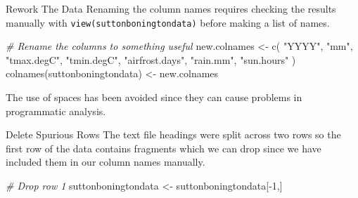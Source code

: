 \documentclass[
  ignorenonframetext,
]{beamer}
\newenvironment{Shaded}{\begin{snugshade}}{\end{snugshade}}
\newcommand{\CommentTok}[1]{\textcolor[rgb]{0.56,0.35,0.01}{\textit{#1}}}
\newcommand{\DecValTok}[1]{\textcolor[rgb]{0.00,0.00,0.81}{#1}}
\newcommand{\FunctionTok}[1]{\textcolor[rgb]{0.00,0.00,0.00}{#1}}
\newcommand{\NormalTok}[1]{#1}
\newcommand{\OtherTok}[1]{\textcolor[rgb]{0.56,0.35,0.01}{#1}}
\newcommand{\SpecialCharTok}[1]{\textcolor[rgb]{0.00,0.00,0.00}{#1}}
\newcommand{\StringTok}[1]{\textcolor[rgb]{0.31,0.60,0.02}{#1}}
\begin{document}
\begin{frame}[fragile]{Rework The Data}
\protect\hypertarget{rework-the-data}{}
Renaming the column names requires checking the results manually with
\texttt{view(suttonboningtondata)} before making a list of names.

\begin{Shaded}
\begin{Highlighting}[]
\CommentTok{\# Rename the columns to something useful}
\NormalTok{new.colnames }\OtherTok{\textless{}{-}} \FunctionTok{c}\NormalTok{( }\StringTok{"YYYY"}\NormalTok{,}
                   \StringTok{"mm"}\NormalTok{,}
                   \StringTok{"tmax.degC"}\NormalTok{,}
                   \StringTok{"tmin.degC"}\NormalTok{,}
                   \StringTok{"airfrost.days"}\NormalTok{,}
                   \StringTok{"rain.mm"}\NormalTok{,}
                   \StringTok{"sun.hours"}
\NormalTok{  )}
\FunctionTok{colnames}\NormalTok{(suttonboningtondata) }\OtherTok{\textless{}{-}}\NormalTok{ new.colnames}
\end{Highlighting}
\end{Shaded}

The use of spaces has been avoided since they can cause problems in
programmatic analysis.
\end{frame}

\begin{frame}[fragile]{Delete Spurious Rows}
\protect\hypertarget{delete-spurious-rows}{}
The text file headings were split across two rows so the first row of
the data contains fragments which we can drop since we have included
them in our column names manually.

\begin{Shaded}
\begin{Highlighting}[]
\CommentTok{\# Drop row 1}
\NormalTok{suttonboningtondata }\OtherTok{\textless{}{-}}\NormalTok{ suttonboningtondata[}\SpecialCharTok{{-}}\DecValTok{1}\NormalTok{,]}
\end{Highlighting}
\end{Shaded}
\end{frame}
\end{document}
